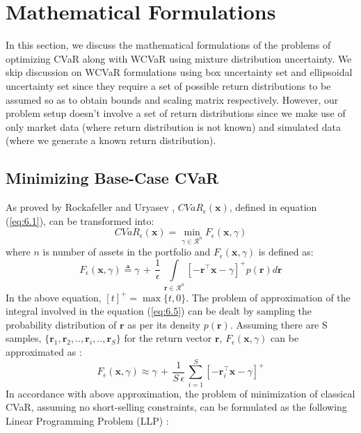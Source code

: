 \section{Mathematical Formulations}
In this section, we discuss the mathematical formulations of the problems of optimizing CVaR along with WCVaR using mixture distribution uncertainty. We skip discussion on WCVaR formulations using box uncertainty set and ellipsoidal uncertainty set since they require a set of possible return distributions to be assumed so as to obtain bounds and scaling matrix respectively. However, our problem setup doesn't involve a set of return distributions since we make use of only market data (where return distribution is not known) and simulated data (where we generate a known return distribution).

\subsection {Minimizing Base-Case CVaR}
As proved by Rockafeller and Uryasev \cite{rockafellar1} , $CVaR_{\epsilon}(\mathbf{x})$, defined in equation (\ref{eq:6.1}), can be transformed into: 
\begin{equation}
\label{eq:6.4}
CVaR_{\epsilon}(\mathbf{x}) = \min_{\gamma \in \mathcal{R}^{n}} F_{\epsilon}(\mathbf{x},\gamma)
\end{equation}
where $n$ is number of assets in the portfolio and $F_{\epsilon}(\mathbf{x},\gamma)$ is defined as:
\begin{equation}
\label{eq:6.5}
 F_{\epsilon}(\mathbf{x},\gamma) \triangleq \gamma \, + \, \frac{1}{\epsilon} \, \int \limits_{\mathbf{r} \in \mathcal{R}^{n}} [-\mathbf{r}^{\top}\mathbf{x}-\gamma]^{+} p(\mathbf{r})  d\mathbf{r}
\end{equation}
In the above equation, $[t]^{+}=\max \{t,0\}$. The problem of approximation of the integral involved in the equation (\ref{eq:6.5}) can be dealt by sampling the probability distribution of $\mathbf{r}$ as per its density $p(\mathbf{r})$. Assuming there are S samples, $\{ \mathbf{r}_{1}, \mathbf{r}_{2}, .., \mathbf{r}_{i},..,\mathbf{r}_{S}\}$ for the return vector $\mathbf{r}$, $ F_{\epsilon}(\mathbf{x},\gamma)$ can be approximated as \cite{rockafellar1}:
\begin{equation}
\label{eq:6.6}
 F_{\epsilon}(\mathbf{x},\gamma) \approx \gamma \, + \, \frac{1}{S \, \epsilon} \, \sum_{i=1}^{S} [-\mathbf{r}_{i}^{\top}\mathbf{x}-\gamma]^{+} 
\end{equation}
In accordance with above approximation, the problem of minimization of classical CVaR, assuming no short-selling constraints, can be formulated as the following Linear Programming Problem (LLP) \cite{rockafellar1,zhu}:
